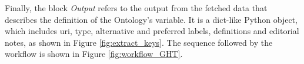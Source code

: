 \documentclass[remotesensing,article,submit,pdftex,moreauthors]{Definitions/mdpi}
\begin{document}



Finally, the block \textit{Output} refers to the output from the fetched data that describes the definition of the Ontology's variable. It is a dict-like Python object, which includes uri, type, alternative and preferred labels, definitions and editorial notes, as shown in Figure \ref{fig:extract_keys}. The sequence followed by the workflow is shown in Figure \ref{fig:workflow_GHT}. 
 
\end{document}
